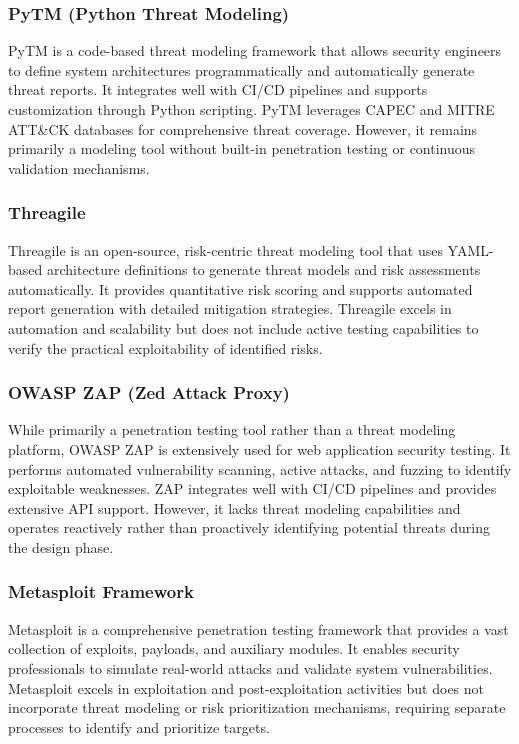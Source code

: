 \subsubsection{PyTM (Python Threat Modeling)}
PyTM is a code-based threat modeling framework that allows security engineers to define system architectures programmatically and automatically generate threat reports. It integrates well with CI/CD pipelines and supports customization through Python scripting. PyTM leverages CAPEC and MITRE ATT\&CK databases for comprehensive threat coverage. However, it remains primarily a modeling tool without built-in penetration testing or continuous validation mechanisms.

\subsubsection{Threagile}
Threagile is an open-source, risk-centric threat modeling tool that uses YAML-based architecture definitions to generate threat models and risk assessments automatically. It provides quantitative risk scoring and supports automated report generation with detailed mitigation strategies. Threagile excels in automation and scalability but does not include active testing capabilities to verify the practical exploitability of identified risks.

\subsubsection{OWASP ZAP (Zed Attack Proxy)}
While primarily a penetration testing tool rather than a threat modeling platform, OWASP ZAP is extensively used for web application security testing. It performs automated vulnerability scanning, active attacks, and fuzzing to identify exploitable weaknesses. ZAP integrates well with CI/CD pipelines and provides extensive API support. However, it lacks threat modeling capabilities and operates reactively rather than proactively identifying potential threats during the design phase.

\subsubsection{Metasploit Framework}
Metasploit is a comprehensive penetration testing framework that provides a vast collection of exploits, payloads, and auxiliary modules. It enables security professionals to simulate real-world attacks and validate system vulnerabilities. Metasploit excels in exploitation and post-exploitation activities but does not incorporate threat modeling or risk prioritization mechanisms, requiring separate processes to identify and prioritize targets.

